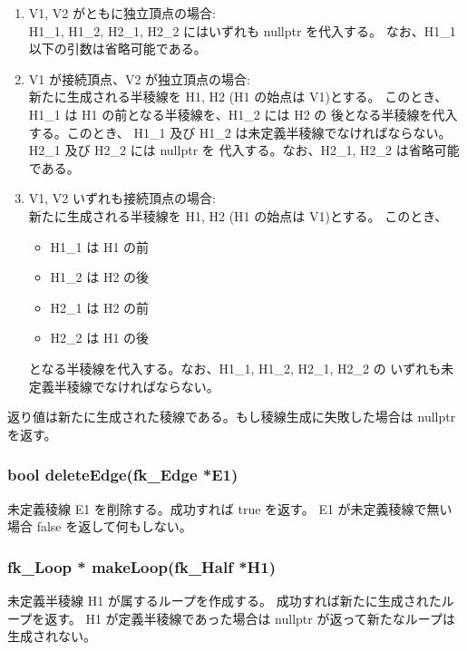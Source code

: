 	\begin{enumerate}
	 \item V1, V2 がともに独立頂点の場合: \\
		H1\_1, H1\_2, H2\_1, H2\_2 にはいずれも nullptr を代入する。
		なお、H1\_1 以下の引数は省略可能である。

	 \item V1 が接続頂点、V2 が独立頂点の場合: \\
		新たに生成される半稜線を H1, H2 (H1 の始点は V1)とする。
		このとき、H1\_1 は H1 の前となる半稜線を、H1\_2 には H2 の
		後となる半稜線を代入する。このとき、
		H1\_1 及び H1\_2 は未定義半稜線でなければならない。
		H2\_1 及び H2\_2 には nullptr を
		代入する。なお、H2\_1, H2\_2 は省略可能である。

	 \item V1, V2 いずれも接続頂点の場合: \\
		新たに生成される半稜線を H1, H2 (H1 の始点は V1)とする。
		このとき、
		\begin{itemize}
		 \item H1\_1 は H1 の前
		 \item H1\_2 は H2 の後
		 \item H2\_1 は H2 の前
		 \item H2\_2 は H1 の後
		\end{itemize}
		となる半稜線を代入する。なお、H1\_1, H1\_2, H2\_1, H2\_2 の
		いずれも未定義半稜線でなければならない。
	\end{enumerate}
	返り値は新たに生成された稜線である。もし稜線生成に失敗した場合は
	nullptr を返す。

 \subsubsection*{\hspace*{0.6cm}bool deleteEdge(fk\_Edge *E1)}
   	未定義稜線 E1 を削除する。成功すれば true を返す。
	E1 が未定義稜線で無い場合 false を返して何もしない。


 \subsubsection*{\hspace*{0.6cm}fk\_Loop * makeLoop(fk\_Half *H1)}
	未定義半稜線 H1 が属するループを作成する。
	成功すれば新たに生成されたループを返す。
	H1 が定義半稜線であった場合は nullptr が返って新たなループは生成されない。

